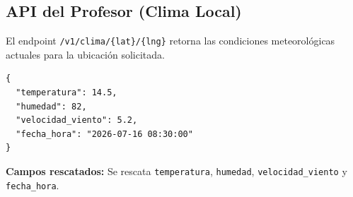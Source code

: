 \documentclass[12pt,a4paper]{article}
\begin{document}
\subsection{API del Profesor (Clima Local)}
El endpoint \texttt{/v1/clima/\{lat\}/\{lng\}} retorna las condiciones meteorológicas actuales para la ubicación solicitada.

\begin{verbatim}
{
  "temperatura": 14.5,
  "humedad": 82,
  "velocidad_viento": 5.2,
  "fecha_hora": "2026-07-16 08:30:00"
}
\end{verbatim}
\textbf{Campos rescatados:} Se rescata \texttt{temperatura}, \texttt{humedad}, \texttt{velocidad\_viento} y \texttt{fecha\_hora}.
\end{document}
